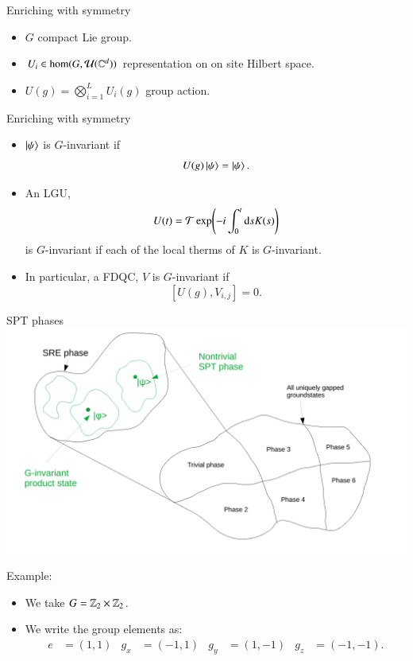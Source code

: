 \documentclass{beamer}
\begin{document}
\begin{frame}{Enriching with symmetry}
	\begin{center}
		\scalebox{0.75}{
		
		}
	\end{center}
	\begin{itemize}
		\item $G$ compact Lie group.
		\item $U_i\in\hom(G,\mathcal{U}(\mathbb{C}^d))$ representation on on site Hilbert space.
		\item $U(g)=\bigotimes_{i=1}^{L}U_i(g)$ group action.
	\end{itemize}
\end{frame}

\begin{frame}{Enriching with symmetry}
	\begin{itemize}
		\item<1-> $\ket{\psi}$ is $G$-invariant if
		\[U(g)\ket{\psi}=\ket{\psi}.\]
		\item<2-> An LGU,
		\[U(t)=\mathcal{T}\exp(-i\int_0^t \textrm{d} s K(s))\]
		is $G$-invariant if each of the local therms of $K$ is $G$-invariant.
		\item<3-> In particular, a FDQC, $V$ is $G$-invariant if
		\[[U(g),V_{i,j}]=0.\]
	\end{itemize}
\end{frame}

\begin{frame}{SPT phases}
	\includegraphics[width=\textwidth]{Figures/SPT_Phases.pdf}
\end{frame}

\begin{frame}{Example:}
	\begin{itemize}
		\item We take $G=\mathbb{Z}_2\times\mathbb{Z}_2$.
		\item We write the group elements as:
		\begin{align*}
			e&=(1,1)&g_x&=(-1,1)&g_y&=(1,-1)&g_z&=(-1,-1).
		\end{align*}
	\end{itemize}
	
\end{frame}
\end{document}
